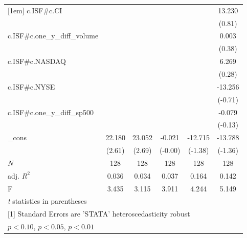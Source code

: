 \begin{table}[htbp]
\begin{tabular}{l*{5}{c}}
[1em]
c.ISF#c.CI  &                     &                     &                     &                     &      13.230         \\
            &                     &                     &                     &                     &      (0.81)         \\
[1em]
c.ISF#c.one\_y\_diff\_volume&                     &                     &                     &                     &       0.003         \\
            &                     &                     &                     &                     &      (0.38)         \\
[1em]
c.ISF#c.NASDAQ&                     &                     &                     &                     &       6.269         \\
            &                     &                     &                     &                     &      (0.28)         \\
[1em]
c.ISF#c.NYSE&                     &                     &                     &                     &     -13.256         \\
            &                     &                     &                     &                     &     (-0.71)         \\
[1em]
c.ISF#c.one\_y\_diff\_sp500&                     &                     &                     &                     &      -0.079         \\
            &                     &                     &                     &                     &     (-0.13)         \\
[1em]
\_cons      &      22.180\sym{**} &      23.052\sym{***}&      -0.021         &     -12.715         &     -13.788         \\
            &      (2.61)         &      (2.69)         &     (-0.00)         &     (-1.38)         &     (-1.36)         \\
\hline
\(N\)       &         128         &         128         &         128         &         128         &         128         \\
adj. \(R^{2}\)&       0.036         &       0.034         &       0.037         &       0.164         &       0.142         \\
F           &       3.435         &       3.115         &       3.911         &       4.244         &       5.149         \\
\hline\hline
\multicolumn{6}{l}{\footnotesize \textit{t} statistics in parentheses}\\
\multicolumn{6}{l}{\footnotesize [1] Standard Errors are 'STATA' heteroscedasticity robust}\\
\multicolumn{6}{l}{\footnotesize \sym{*} \(p<0.10\), \sym{**} \(p<0.05\), \sym{***} \(p<0.01\)}\\
\end{tabular}
\end{table}
